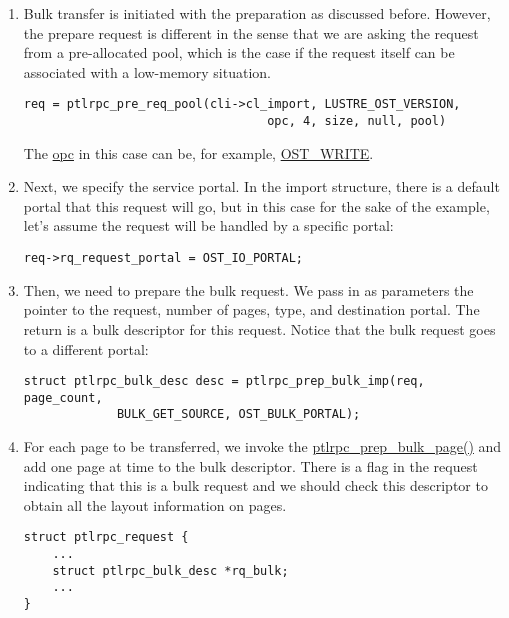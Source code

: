 \begin{enumerate}

\item Bulk transfer is initiated with the preparation as discussed before.
However, the prepare request is different in the sense that we are asking the
request from a pre-allocated pool, which is the case if the request itself can be
associated with a low-memory situation.

\begin{Verbatim}
req = ptlrpc_pre_req_pool(cli->cl_import, LUSTRE_OST_VERSION, 
                                  opc, 4, size, null, pool)
\end{Verbatim}

The \url{opc} in this case can be, for example, \url{OST_WRITE}.

\item Next, we specify the service portal. In the import structure, there is a
default portal that this request will go, but in this case for the sake of the
example, let's assume the request will be handled by a specific portal:

\begin{Verbatim}
req->rq_request_portal = OST_IO_PORTAL;
\end{Verbatim}

\item Then, we need to prepare the bulk request. We pass in as parameters the
pointer to the request, number of pages, type, and destination portal. The
return is a bulk descriptor for this request. Notice that the bulk request goes
to a different portal:

\begin{Verbatim}
struct ptlrpc_bulk_desc desc = ptlrpc_prep_bulk_imp(req, page_count, 
             BULK_GET_SOURCE, OST_BULK_PORTAL);
\end{Verbatim}

\item For each page to be transferred, we invoke the
\url{ptlrpc_prep_bulk_page()} and add one page at time to the bulk descriptor.
There is a flag in the request indicating that this is a bulk request and we
should check this descriptor to obtain all the layout information on pages.

\begin{Verbatim}
struct ptlrpc_request {
    ...
    struct ptlrpc_bulk_desc *rq_bulk;
    ...
}
\end{Verbatim}

\end{enumerate}

